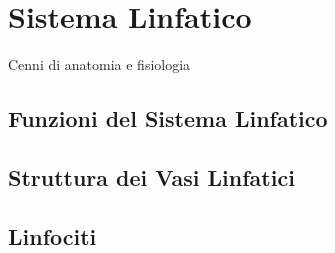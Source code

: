 \chapter{Sistema Linfatico}

Cenni di anatomia e fisiologia

\section{Funzioni del Sistema Linfatico}
\section{Struttura dei Vasi Linfatici}
\section{Linfociti}